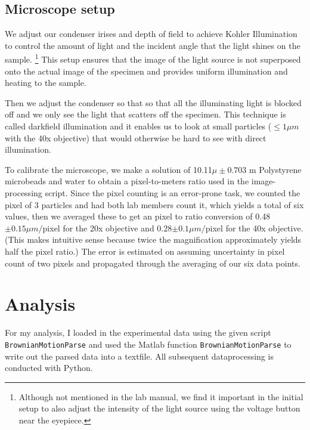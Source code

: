 \documentclass[iop,revtex4]{emulateapj_mod}
\begin{document}
\subsection{Microscope setup}\label{kohler}
\par  We adjust our condenser irises and depth of field to achieve Kohler Illumination to control the amount of light and the incident angle that the light shines on the sample. \footnote{Although not mentioned in the lab manual, we find it important in the initial setup to also adjust the intensity of the light source using the voltage button near the eyepiece.} This setup ensures that the image of the light source is not superposed onto the actual image of the specimen and provides uniform illumination and heating to the sample.  
\par Then we adjust the condenser so that so that all the illuminating light is blocked off and we only see the light that scatters off the specimen. This technique is called darkfield illumination and it enables us to look at small particles ($\leq1\mu m$ with the 40x objective) that would otherwise be hard to see with direct illumination.
\par To calibrate the microscope, we make a solution of 10.11$\mu \pm 0.703$ m Polystyrene microbeads and water to obtain a pixel-to-meters ratio used in the image-processing script. Since the pixel counting is an error-prone task, we counted the pixel of 3 particles and had both lab members count it, which yields a total of six values, then we averaged these to get an pixel to ratio conversion of 0.48 $\pm 0.15\mu m/$pixel for the 20x objective and 0.28$\pm 0.1 \mu m/$pixel for the 40x objective. (This makes intuitive sense because twice the magnification approximately yields half the pixel ratio.) The error is estimated on assuming uncertainty in pixel count of two pixels and propagated through the averaging of our six data points.
\section{Analysis}\label{sec:analysis}
\par For my analysis, I loaded in the experimental data using the given script \texttt{BrownianMotionParse} and used the Matlab function \texttt{BrownianMotionParse} to write out the parsed data into a textfile. All subsequent dataprocessing is conducted with Python. 
\end{document}
